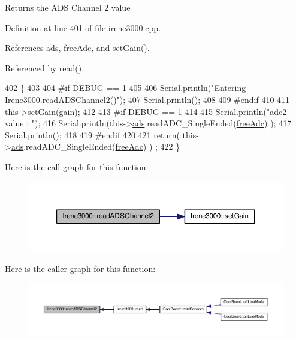 \begin{DoxyReturn}{Returns}
the A\+DS Channel 2 value 
\end{DoxyReturn}


Definition at line 401 of file irene3000.\+cpp.



References ads, free\+Adc, and set\+Gain().



Referenced by read().


\begin{DoxyCode}
402 \{   
403 
404 \textcolor{preprocessor}{#if DEBUG == 1 }
405     
406     Serial.println(\textcolor{stringliteral}{"Entering Irene3000.readADSChannel2()"});
407     Serial.println();
408 
409 \textcolor{preprocessor}{#endif}
410 
411     this->\hyperlink{classIrene3000_aff7c5da186b388e7272e63ff88a20c34}{setGain}(gain);
412 
413 \textcolor{preprocessor}{#if DEBUG == 1 }
414     
415     Serial.println(\textcolor{stringliteral}{"adc2 value : "});
416     Serial.println(this->\hyperlink{classIrene3000_a1215e77ba761c9908d80d691f149e135}{ads}.readADC\_SingleEnded(\hyperlink{Irene3000_8h_a55497513af255250e464ed76543d46d7}{freeAdc}) );
417     Serial.println();
418 
419 \textcolor{preprocessor}{#endif}
420 
421     \textcolor{keywordflow}{return}( this->\hyperlink{classIrene3000_a1215e77ba761c9908d80d691f149e135}{ads}.readADC\_SingleEnded(\hyperlink{Irene3000_8h_a55497513af255250e464ed76543d46d7}{freeAdc}) ) ;
422 \}
\end{DoxyCode}
Here is the call graph for this function\+:\nopagebreak
\begin{figure}[H]
\begin{center}
\leavevmode
\includegraphics[width=350pt]{classIrene3000_ae73bd2ed14a199a7e83f4d6458476a7c_cgraph}
\end{center}
\end{figure}
Here is the caller graph for this function\+:\nopagebreak
\begin{figure}[H]
\begin{center}
\leavevmode
\includegraphics[width=350pt]{classIrene3000_ae73bd2ed14a199a7e83f4d6458476a7c_icgraph}
\end{center}
\end{figure}
\mbox{\label{classIrene3000_ae0e0a5b773c3625b44c1d113c76a1540}} 
